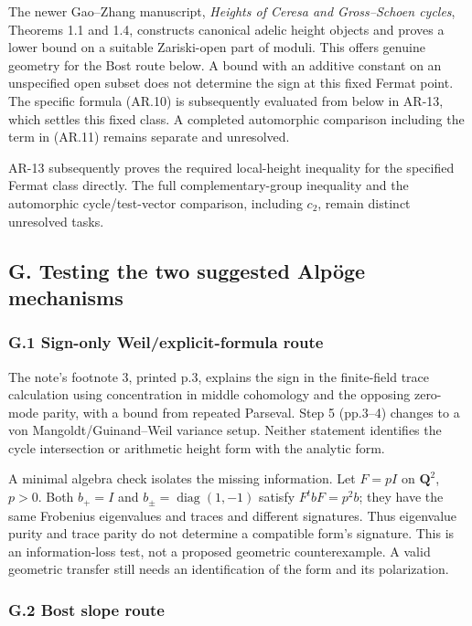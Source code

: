 The newer Gao--Zhang manuscript, \emph{Heights of Ceresa and
Gross--Schoen cycles}, Theorems 1.1 and 1.4, constructs canonical adelic
height objects and proves a lower bound on a suitable Zariski-open part
of moduli. This offers genuine geometry for the Bost route below. A
bound with an additive constant on an unspecified open subset does not
determine the sign at this fixed Fermat point. The specific formula
(AR.10) is subsequently evaluated from below in AR-13, which settles
this fixed class. A completed automorphic comparison including the term
in (AR.11) remains separate and unresolved.

AR-13 subsequently proves the required local-height inequality for the
specified Fermat class directly. The full complementary-group inequality
and the automorphic cycle/test-vector comparison, including \(c_2\),
remain distinct unresolved tasks.

\subsection{G. Testing the two suggested Alpöge
mechanisms}\label{g.-testing-the-two-suggested-alpuxf6ge-mechanisms}

\subsubsection{G.1 Sign-only Weil/explicit-formula
route}\label{g.1-sign-only-weilexplicit-formula-route}

The note's footnote 3, printed p.3, explains the sign in the
finite-field trace calculation using concentration in middle cohomology
and the opposing zero-mode parity, with a bound from repeated Parseval.
Step 5 (pp.3--4) changes to a von Mangoldt/Guinand--Weil variance setup.
Neither statement identifies the cycle intersection or arithmetic height
form with the analytic form.

A minimal algebra check isolates the missing information. Let \(F=pI\)
on \(\mathbf Q^2\), \(p>0\). Both \(b_+=I\) and
\(b_\pm=\operatorname{diag}(1,-1)\) satisfy \(F^tbF=p^2b\); they have
the same Frobenius eigenvalues and traces and different signatures. Thus
eigenvalue purity and trace parity do not determine a compatible form's
signature. This is an information-loss test, not a proposed geometric
counterexample. A valid geometric transfer still needs an identification
of the form and its polarization.

\subsubsection{G.2 Bost slope route}\label{g.2-bost-slope-route}

